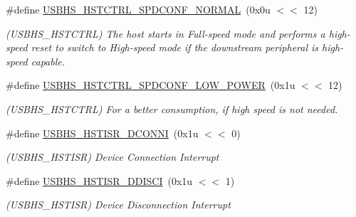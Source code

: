 \begin{DoxyCompactItemize}
\item 
\mbox{\label{group__SAMS70__USBHS_ga64e316d861e4536eeef786752d54af55}} 
\#define \mbox{\hyperlink{group__SAMS70__USBHS_ga64e316d861e4536eeef786752d54af55}{U\+S\+B\+H\+S\+\_\+\+H\+S\+T\+C\+T\+R\+L\+\_\+\+S\+P\+D\+C\+O\+N\+F\+\_\+\+N\+O\+R\+M\+AL}}~(0x0u $<$$<$ 12)
\begin{DoxyCompactList}\small\item\em (U\+S\+B\+H\+S\+\_\+\+H\+S\+T\+C\+T\+RL) The host starts in Full-\/speed mode and performs a high-\/speed reset to switch to High-\/speed mode if the downstream peripheral is high-\/speed capable. \end{DoxyCompactList}\item 
\mbox{\label{group__SAMS70__USBHS_gadf2f66676fae0988982122a3832dda2a}} 
\#define \mbox{\hyperlink{group__SAMS70__USBHS_gadf2f66676fae0988982122a3832dda2a}{U\+S\+B\+H\+S\+\_\+\+H\+S\+T\+C\+T\+R\+L\+\_\+\+S\+P\+D\+C\+O\+N\+F\+\_\+\+L\+O\+W\+\_\+\+P\+O\+W\+ER}}~(0x1u $<$$<$ 12)
\begin{DoxyCompactList}\small\item\em (U\+S\+B\+H\+S\+\_\+\+H\+S\+T\+C\+T\+RL) For a better consumption, if high speed is not needed. \end{DoxyCompactList}\item 
\mbox{\label{group__SAMS70__USBHS_ga26736532c2bf0a1896b0623528e638f9}} 
\#define \mbox{\hyperlink{group__SAMS70__USBHS_ga26736532c2bf0a1896b0623528e638f9}{U\+S\+B\+H\+S\+\_\+\+H\+S\+T\+I\+S\+R\+\_\+\+D\+C\+O\+N\+NI}}~(0x1u $<$$<$ 0)
\begin{DoxyCompactList}\small\item\em (U\+S\+B\+H\+S\+\_\+\+H\+S\+T\+I\+SR) Device Connection Interrupt \end{DoxyCompactList}\item 
\mbox{\label{group__SAMS70__USBHS_ga9bf0cbe3f438eb0ab5d55527be1666bb}} 
\#define \mbox{\hyperlink{group__SAMS70__USBHS_ga9bf0cbe3f438eb0ab5d55527be1666bb}{U\+S\+B\+H\+S\+\_\+\+H\+S\+T\+I\+S\+R\+\_\+\+D\+D\+I\+S\+CI}}~(0x1u $<$$<$ 1)
\begin{DoxyCompactList}\small\item\em (U\+S\+B\+H\+S\+\_\+\+H\+S\+T\+I\+SR) Device Disconnection Interrupt \end{DoxyCompactList}\item 

\end{DoxyCompactItemize}
